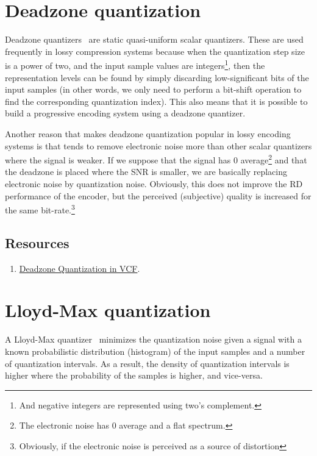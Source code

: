 \section{Deadzone quantization}

Deadzone quantizers~\cite{vruiz__scalar_quantization} are static
quasi-uniform scalar quantizers. These are used frequently in lossy
compression systems because when the quantization step size is a power
of two, and the input sample values are integers\footnote{And negative
integers are represented using two's complement.}, then the
representation levels can be found by simply discarding
low-significant bits of the input samples (in other words, we only
need to perform a bit-shift operation to find the corresponding
quantization index). This also means that it is possible to build a
progressive encoding system using a deadzone quantizer.

Another reason that makes deadzone quantization popular in lossy
encoding systems is that tends to remove electronic noise more than
other scalar quantizers where the signal is weaker. If we suppose that
the signal has 0 average\footnote{The electronic noise has 0 average
and a flat spectrum.} and that the deadzone is placed where the SNR is
smaller, we are basically replacing electronic noise by quantization
noise. Obviously, this does not improve the RD performance of the
encoder, but the perceived (subjective) quality is increased for the
same bit-rate.\footnote{Obviously, if the electronic noise is
perceived as a source of distortion}

\subsection*{Resources}
\begin{enumerate}
\item
  \href{https://github.com/Sistemas-Multimedia/VCF/blob/main/src/deadzone.py}{Deadzone
    Quantization in VCF}.
\end{enumerate}

\section{Lloyd-Max quantization}

A Lloyd-Max quantizer~\cite{vruiz__scalar_quantization} minimizes the
quantization noise given a signal with a known probabilistic
distribution (histogram) of the input samples and a number of
quantization intervals. As a result, the density of quantization
intervals is higher where the probability of the samples is higher, and
vice-versa.

